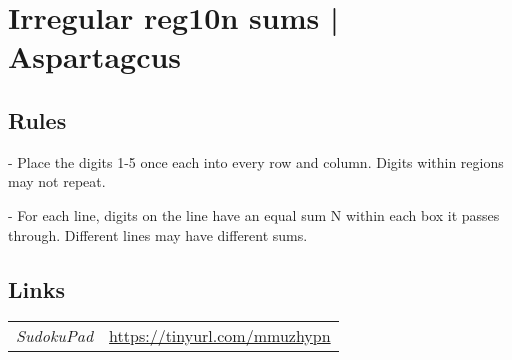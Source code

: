 \section[Irregular reg10n sums | Aspartagcus {[\emph{5\emph{x}5 Irregular Region Sums Sudoku}]}]{Irregular reg10n sums | {\normalfont Aspartagcus}}
\label{sec:37-irregular-reg10n-sums-aspartagcus}

\subsection*{Rules}
\begin{markdown}
- Place the digits 1-5 once each into every row and column. Digits within regions may not repeat.

- For each line, digits on the line have an equal sum N within each box it passes through. Different lines may have different sums.
\end{markdown}
\subsection*{Links}
\begin{tabularx}{\textwidth}{l X}
\emph{SudokuPad} & \url{https://tinyurl.com/mmuzhypn} \\
\end{tabularx}
\pagebreak
